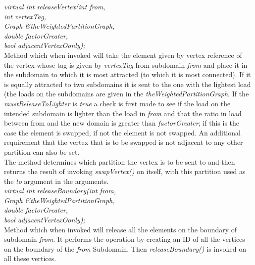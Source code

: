 {\em virtual int releaseVertex(int from, \\
\indent\indent\indent\indent\indent int vertexTag, \\
\indent\indent\indent\indent\indent Graph \&theWeightedPartitionGraph, \\
\indent\indent\indent\indent\indent double factorGreater, \\
\indent\indent\indent\indent\indent bool adjacentVertexOonly); } \\
Method which when invoked will take the element given by vertex
reference of the vertex whose tag is given by {\em vertexTag} from
subdomain {\em from} and place it in the subdomain to which it is most
attracted (to which it is most connected). If it is equally attracted
to two subdomains it is sent to the one with the lightest load (the
loads on the subdomains are given in the {\em
theWeightedPartitionGraph}. If the {\em mustReleaseToLighter} is {\em
true} a check is first made to see if the load on the intended
subdomain is lighter than the load in {\em from} and that the ratio in
load between from and the new domain is greater than {\em
factorGreater}; if this is the case the element is swapped, if not the
element is not swapped. An additional requirement that the vertex that
is to be swapped is not adjacent to any other partition can also be
set. \\ 
The method determines which partition the vertex is to be sent to and
then returns the result of invoking {\em swapVertex()} on itself, with
this partition used as the {\em to} argument in the arguments. \\

{\em virtual int releaseBoundary(int from, \\
\indent\indent\indent\indent\indent Graph \&theWeightedPartitionGraph, \\
\indent\indent\indent\indent\indent double factorGreater, \\
\indent\indent\indent\indent\indent bool adjacentVertexOonly); } \\
Method which when invoked will release all the elements on the
boundary of subdomain {\em from}. It performs the operation by
creating an ID of all the vertices on the boundary of the {\em from}
Subdomain. Then {\em releaseBoundary()} is invoked on all these vertices. \\


